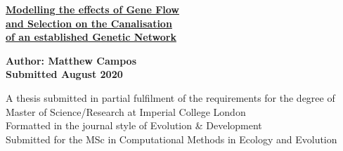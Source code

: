 \begin{titlepage}
    \begin{center}
    \vspace*{1cm}

    \Huge
    \textbf{\underline{Modelling the effects of Gene Flow}}\\
    \textbf{\underline{and Selection on the Canalisation}}\\
    \textbf{\underline{of an established Genetic Network}}\\

    \vspace*{2.0cm}

    \large
    \textbf{Author: Matthew Campos}\\
    \textbf{Submitted August 2020}

    \vspace*{0.8cm}

    \normalsize
    A thesis submitted in partial fulfilment of the requirements for the degree of Master of Science/Research at Imperial College London\\
    Formatted in the journal style of Evolution \& Development\\
    Submitted for the MSc in Computational Methods in Ecology and Evolution\\

    \vspace*{0.8cm}

    \end{center}
\end{titlepage}
